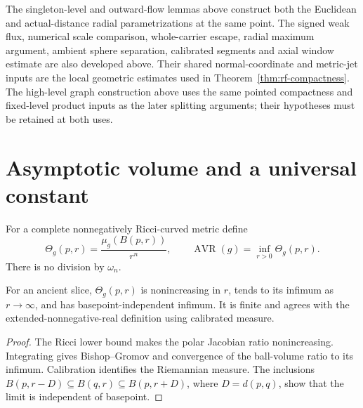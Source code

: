 \label{rem:ancient-neck-input}
The singleton-level and outward-flow lemmas above construct both the
Euclidean and actual-distance radial parametrizations at the same point.
The signed weak flux, numerical scale comparison, whole-carrier escape,
radial maximum argument, ambient sphere separation, calibrated segments
and axial window estimate are also developed above.  Their shared
normal-coordinate and metric-jet inputs are the local geometric
estimates used in Theorem~\ref{thm:rf-compactness}.
The high-level graph construction above uses the same pointed
compactness and fixed-level product inputs as the later splitting
arguments; their hypotheses must be retained at both uses.


\section{Asymptotic volume and a universal constant}

For a complete nonnegatively Ricci-curved metric define
\[
 \Theta_g(p,r)=\frac{\mu_g(B(p,r))}{r^n},\qquad
 \operatorname{AVR}(g)=\inf_{r>0}\Theta_g(p,r).
\]
There is no division by $\omega_n$.

\begin{proposition}
\label{prop:ancient-avr}
For an ancient slice, $\Theta_g(p,r)$ is nonincreasing in $r$, tends
to its infimum as $r\to\infty$, and has basepoint-independent infimum.
It is finite and agrees with the extended-nonnegative-real definition
using calibrated measure.
\end{proposition}
\begin{proof}
The Ricci lower bound makes the polar Jacobian ratio nonincreasing.
Integrating gives Bishop--Gromov and convergence of the ball-volume ratio to
its infimum. Calibration identifies the Riemannian measure. The inclusions
$B(p,r-D)\subseteq B(q,r)\subseteq B(p,r+D)$, where $D=d(p,q)$, show that the
limit is independent of basepoint.
\end{proof}

